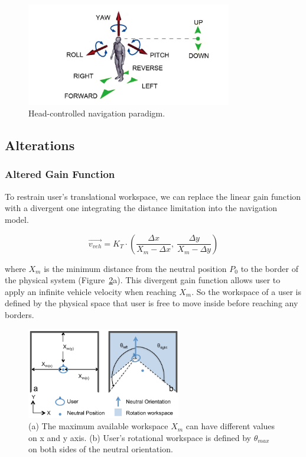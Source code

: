 \begin{figure}[tb]
  \centering
  \includegraphics[width=0.8\textwidth]{figures/ch3/HCNav}
  \caption{\label{fig:3_hcnav}Head-controlled navigation paradigm.}
\end{figure}

\subsection{Alterations}

\subsubsection{Altered Gain Function}
 To restrain user's translational workspace, we can replace the linear gain function with a divergent one integrating the distance limitation into the navigation model.

\begin{equation}
\overrightarrow{v_{veh}}=K_{T}\cdot \left(\frac{\Delta x}{X_{m}-\Delta x},\:\frac{\Delta y}{X_{m}-\Delta y}\right)
\end{equation}

where $X_{m}$ is the minimum distance from the neutral position $P_{0}$ to the border of the physical system (Figure~\ref{fig:3_workspace_border}a). This divergent gain function allows user to apply an infinite vehicle velocity when reaching $X_{m}$. So the workspace of a user is defined by the physical space that user is free to move inside before reaching any borders.

\begin{figure}[tb]
\begin{center}
\includegraphics[width=0.6\textwidth]{figures/ch3/workspace_border}
\par\end{center}
\caption{\label{fig:3_workspace_border}(a) The maximum available workspace $X_{m}$ can have different values on x and y axis. (b) User's rotational workspace is defined by $\theta_{max}$ on both sides of the neutral orientation.}
\end{figure}

